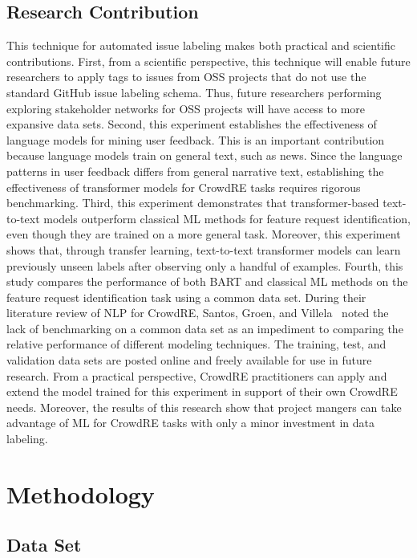 \subsection{Research Contribution}

This technique for automated issue labeling makes both practical and scientific contributions. First, from a scientific perspective, this technique will enable future researchers to apply tags to issues from OSS projects that do not use the standard GitHub issue labeling schema. Thus, future researchers performing exploring stakeholder networks for OSS projects will have access to more expansive data sets. Second, this experiment establishes the effectiveness of language models for mining user feedback. This is an important contribution because language models train on general text, such as news. Since the language patterns in user feedback differs from general narrative text, establishing the effectiveness of transformer models for CrowdRE tasks requires rigorous benchmarking. Third, this experiment demonstrates that transformer-based text-to-text models outperform classical ML methods for feature request identification, even though they are trained on a more general task. Moreover, this experiment shows that, through transfer learning, text-to-text transformer models can learn previously unseen labels after observing only a handful of examples. Fourth, this study compares the performance of both BART and classical ML methods on the feature request identification task using a common data set. During their literature review of NLP for CrowdRE, Santos, Groen, and Villela~\cite{santos} noted the lack of benchmarking on a common data set as an impediment to comparing the relative performance of different modeling techniques. The training, test, and validation data sets are posted online and freely available for use in future research. From a practical perspective, CrowdRE practitioners can apply and extend the model trained for this experiment in support of their own CrowdRE needs. Moreover, the results of this research show that project mangers can take advantage of ML for CrowdRE tasks with only a minor investment in data labeling.

\section{Methodology}

\subsection{Data Set}

